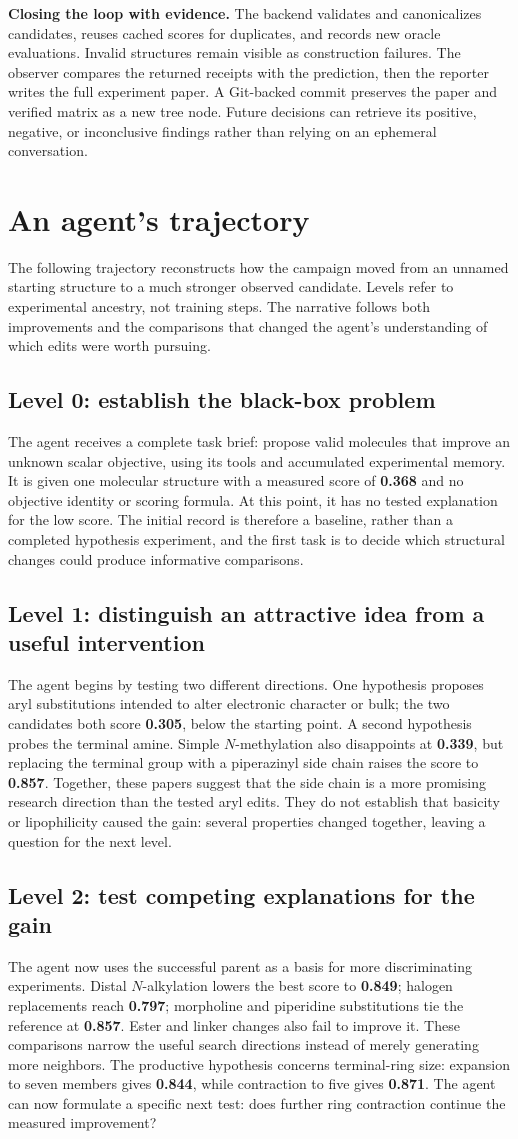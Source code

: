\documentclass[11pt,a4paper]{article}
\newcommand{\level}[1]{\subsection*{#1}}
\begin{document}
\textbf{Closing the loop with evidence.} The backend validates and canonicalizes candidates, reuses cached scores for duplicates, and records new oracle evaluations. Invalid structures remain visible as construction failures. The observer compares the returned receipts with the prediction, then the reporter writes the full experiment paper. A Git-backed commit preserves the paper and verified matrix as a new tree node. Future decisions can retrieve its positive, negative, or inconclusive findings rather than relying on an ephemeral conversation.

\newpage
\section{An agent's trajectory}
The following trajectory reconstructs how the campaign moved from an unnamed starting structure to a much stronger observed candidate. Levels refer to experimental ancestry, not training steps. The narrative follows both improvements and the comparisons that changed the agent's understanding of which edits were worth pursuing.

\level{Level 0: establish the black-box problem}
The agent receives a complete task brief: propose valid molecules that improve an unknown scalar objective, using its tools and accumulated experimental memory. It is given one molecular structure with a measured score of \textbf{0.368} and no objective identity or scoring formula. At this point, it has no tested explanation for the low score. The initial record is therefore a baseline, rather than a completed hypothesis experiment, and the first task is to decide which structural changes could produce informative comparisons.

\level{Level 1: distinguish an attractive idea from a useful intervention}
The agent begins by testing two different directions. One hypothesis proposes aryl substitutions intended to alter electronic character or bulk; the two candidates both score \textbf{0.305}, below the starting point. A second hypothesis probes the terminal amine. Simple $N$-methylation also disappoints at \textbf{0.339}, but replacing the terminal group with a piperazinyl side chain raises the score to \textbf{0.857}. Together, these papers suggest that the side chain is a more promising research direction than the tested aryl edits. They do not establish that basicity or lipophilicity caused the gain: several properties changed together, leaving a question for the next level.

\level{Level 2: test competing explanations for the gain}
The agent now uses the successful parent as a basis for more discriminating experiments. Distal $N$-alkylation lowers the best score to \textbf{0.849}; halogen replacements reach \textbf{0.797}; morpholine and piperidine substitutions tie the reference at \textbf{0.857}. Ester and linker changes also fail to improve it. These comparisons narrow the useful search directions instead of merely generating more neighbors. The productive hypothesis concerns terminal-ring size: expansion to seven members gives \textbf{0.844}, while contraction to five gives \textbf{0.871}. The agent can now formulate a specific next test: does further ring contraction continue the measured improvement?
\end{document}
